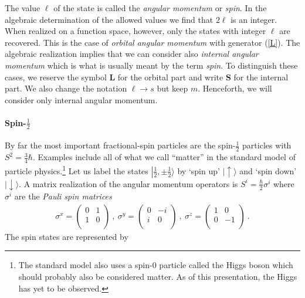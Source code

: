 \documentclass[12pt]{article}
\def\ket#1{\left| #1\rangle\right.}
\begin{document}
The value $\ell$ of the state is called the {\em angular momentum} or {\em spin}. In the algebraic determination of the allowed values we find that $2\ell$ is an integer. When realized on a function space, however, only the states with integer $\ell$ are recovered. This is the case of {\em orbital angular momentum} with generator (\ref{L}). The algebraic realization implies that we can consider also {\em internal angular momentum} which is what is usually meant by the term {\em spin}. To distinguish these cases, we reserve the symbol $\mathbf L$ for the orbital part and write $\mathbf S$ for the internal part. We also change the notation $\ell \to s$ but keep $m$. Henceforth, we will consider only internal angular momentum. 

\paragraph{Spin-$\frac12$} By far the most important fractional-spin particles are the spin-$\frac 12$ particles with $S^2=\frac 34 \hbar$. Examples include all of what we call ``matter'' in the standard model of particle physics.\footnote{The standard model also uses a spin-0 particle called the Higgs boson which should probably also be considered matter. As of this presentation, the Higgs has yet to be observed.} Let us label the states $\ket{{\frac12},{\pm \frac12}}$ by `spin up' $\ket{\uparrow}$ and `spin down' $\ket{\downarrow}$. A matrix realization of the angular momentum operators is $S^i=\frac \hbar2 \sigma^i$ where $\sigma^i$ are the {\em Pauli spin matrices}
\begin{eqnarray}
\sigma^x= 
   \begin{pmatrix} %
      0 & 1 \\
      1 & 0 \\
   \end{pmatrix}
~,~
\sigma^y= 
   \begin{pmatrix} %
      0 & -i \\
      i & 0 \\
   \end{pmatrix}
~,~
\sigma^z= 
   \begin{pmatrix} %
      1 & 0 \\
      0 & -1 \\
   \end{pmatrix}
~.
\end{eqnarray}
The spin states are represented by 
\end{document}
